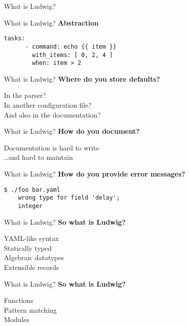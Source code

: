 \documentclass[20pt]{beamer}
\newcommand{\vspaced}{
    \vspace{5mm}
}
\begin{document}
\begin{frame}{What is Ludwig?}
\end{frame}

\begin{frame}[fragile]{What is Ludwig?}
    \textbf{Abstraction}
    \vspaced
    \begin{lstlisting}[keywords = {}]
    tasks:
      - command: echo {{ item }}
        with_items: [ 0, 2, 4 ]
        when: item > 2
    \end{lstlisting}
\end{frame}

\begin{frame}[fragile]{What is Ludwig?}
    \textbf{Where do you store defaults?} \\
    \vspaced
    In the parser? \\
    In another configuration file? \\
    And also in the documentation? \\
\end{frame}

\begin{frame}[fragile]{What is Ludwig?}
    \textbf{How do you document?} \\
    \vspaced
    Documentation is hard to write \\
    \dots and hard to maintain \\
\end{frame}

\begin{frame}[fragile]{What is Ludwig?}
    \textbf{How do you provide error messages?} \\
    \vspaced
    \begin{lstlisting}[keywords = {}]
    $ ./foo bar.yaml
    wrong type for field 'delay';
    integer
    \end{lstlisting}
\end{frame}

\begin{frame}{What is Ludwig?}
    \textbf{So what is Ludwig?} \\
    \vspaced
    YAML-like syntax \\
    Statically typed \\
    Algebraic datatypes \\
    Extensible records \\
\end{frame}

\begin{frame}{What is Ludwig?}
    \textbf{So what is Ludwig?} \\
    \vspaced
    Functions \\
    Pattern matching \\
    Modules \\
\end{frame}
\end{document}
